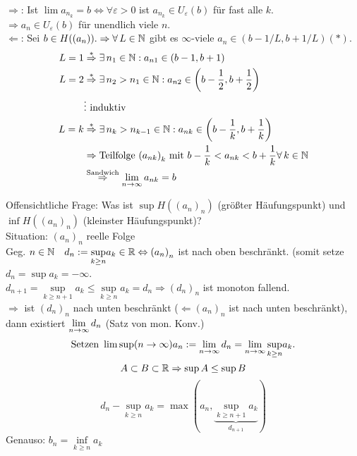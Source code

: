 \documentclass[../ana1.tex]{subfiles}
\begin{document}
\begin{bew}
	\glqq{}\(\Rightarrow \)\grqq{}: Ist \(\lim a_{n_k} = b \Leftrightarrow \forall \varepsilon >0 \) ist \( a_{n_k} \in U_\varepsilon(b) \) für fast alle \(k\).\\
	\( \Rightarrow a_n \in U_\varepsilon(b) \) für unendlich viele \(n\).\\
	\glqq{}\(\Leftarrow \)\grqq{}: Sei \(b \in H((a_n)). \Rightarrow \forall L\in \N \) gibt es \(\infty \)-viele \( a_n \in (b-1/L, b+1/L) (*) \).\\
	\begin{align*}
		L = 1 &\overset{*}{\Rightarrow} \exists n_1 \in \N: a_{n1} \in (b-1, b+1)\\
		L = 2 &\overset{*}{\Rightarrow} \exists n_2 > n_1 \in \N: a_{n2} \in \left(b-\frac{1}{2}, b+\frac{1}{2}\right)\\
		&\vdots \text{ induktiv}\\
		L = k &\overset{*}{\Rightarrow} \exists n_k > n_{k-1} \in \N: a_{nk} \in \left(b-\frac{1}{k}, b+\frac{1}{k}\right)\\
		&\Rightarrow \text{Teilfolge } {(a_{nk})}_k \text{ mit } b - \frac{1}{k} < a_{nk} < b + \frac{1}{k} \forall k \in \N \\
		&\overset{\text{Sandwich}}{\Rightarrow} \limes{n} a_{nk} = b
	\end{align*}
\end{bew}
Offensichtliche Frage: Was ist \( \sup H({(a_n)}_n) \) (größter Häufungspunkt) und \(  \inf H({(a_n)}_n) \) (kleinster Häufungspunkt)?\\
Situation: \({(a_n)}_n\) reelle Folge\\
Geg. \(n\in\mathbb{N} \quad d_n := \underset{k\geq n}{\sup}a_k \in \mathbb{R} \Leftrightarrow {(a_n)}_n\) ist nach oben beschränkt. (somit setze \(d_n = \sup a_k = -\infty \).\\
\( d_{n+1} = \underset{k\geq n+1}{\sup}a_k \leq \underset{k\geq n}{\sup}a_k = d_n \Longrightarrow {(d_n)}_n \) ist monoton fallend.\\
\( \Rightarrow \) ist \({(d_n)}_n\) nach unten beschränkt (\( \Leftarrow {(a_n)}_n \) ist nach unten beschränkt), dann existiert \( \lim\limits_{n\rightarrow\infty} d_n \) (Satz von mon. Konv.)\\
\[\text{Setzen } \limsup\limits(n\rightarrow\infty) a_n := \lim\limits_{n\rightarrow\infty} d_n = \lim\limits_{n\rightarrow\infty} \underset{k\geq n}{\sup} a_k. \]
\[ A\subset B\subset \mathbb{R} \Rightarrow \sup A \leq \sup B \]
\[ d_n - \underset{k\geq n}{\sup} a_k = \max(a_n, \underbrace{\underset{k\geq n+1}{\sup} a_k}_{d_{n+1}}) \]
Genauso: \(b_n = \underset{k\geq n}{\inf} a_k \)
\end{document}
